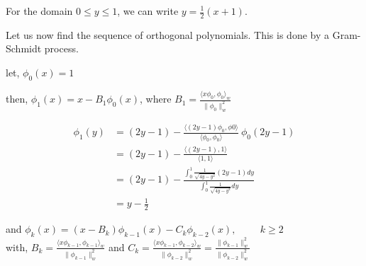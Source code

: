 \documentclass[a4paper,11pt]{report}
\begin{document}
\begin{enumerate}
\begin{itemize}
    For the domain $0 \le y \le 1$, we can write $y = \displaystyle \frac{1}{2} (x + 1)$.
    
    Let us now find the sequence of orthogonal polynomials. This is done by a Gram-Schmidt process. 

    let, $\phi_{0}(x) = 1$

    then, $\phi_{1}(x) = x - B_{1} \phi_{0}(x)$, where $B_{1} = \displaystyle \frac{\langle x \phi_{0}, \phi_{0} \rangle_{w}}{\| \phi_{0} \|_{w}^{2}}$
    
    \begin{equation*}
    \begin{aligned}
    \phi_{1}(y) &= (2y-1) - \displaystyle \frac{\langle (2y-1) \phi_{0}, \phi{0} \rangle}{\langle \phi_{0}, \phi_{0} \rangle}\ \phi_{0}(2y-1) \\
                &= (2y-1) - \displaystyle \frac{\langle (2y-1), 1 \rangle}{\langle 1, 1 \rangle} \\
                &= (2y-1) - \displaystyle \frac{\displaystyle\int_{0}^{1} \frac{1}{\sqrt{4y-y^2}} (2y-1) dy}{\displaystyle\int_{0}^{1} \frac{1}{\sqrt{4y-y^2}} dy} \\
                &= y - \frac{1}{2}
    \end{aligned}
    \end{equation*}

    and $\phi_{k}(x) = (x - B_{k}) \phi_{k-1}(x) - C_{k} \phi_{k-2}(x), \hspace{1cm} k \ge 2$ \\
    with, $B_{k} = \displaystyle \frac{\langle x \phi_{k-1}, \phi_{k-1} \rangle_{w}}{\| \phi_{k-1} \|_{w}^{2}}$ and
    $C_{k} = \displaystyle \frac{\langle x \phi_{k-1}, \phi_{k-2} \rangle_{w}}{\| \phi_{k-2} \|_{w}^{2}} = \frac{\| \phi_{k-1} \|_{w}^{2}}{\| \phi_{k-2} \|_{w}^{2}}$


\end{itemize}
\end{enumerate}
\end{document}
